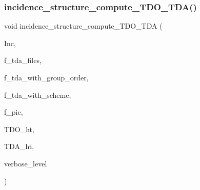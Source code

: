 \subsubsection{\texorpdfstring{incidence\+\_\+structure\+\_\+compute\+\_\+\+T\+D\+O\+\_\+\+T\+D\+A()}{incidence\_structure\_compute\_TDO\_TDA()}}
{\footnotesize\ttfamily void incidence\+\_\+structure\+\_\+compute\+\_\+\+T\+D\+O\+\_\+\+T\+DA (\begin{DoxyParamCaption}\item[{\mbox{\hyperlink{classincidence__structure}{incidence\+\_\+structure}} $\ast$}]{Inc,  }\item[{\mbox{\hyperlink{galois_8h_a09fddde158a3a20bd2dcadb609de11dc}{I\+NT}}}]{f\+\_\+tda\+\_\+files,  }\item[{\mbox{\hyperlink{galois_8h_a09fddde158a3a20bd2dcadb609de11dc}{I\+NT}}}]{f\+\_\+tda\+\_\+with\+\_\+group\+\_\+order,  }\item[{\mbox{\hyperlink{galois_8h_a09fddde158a3a20bd2dcadb609de11dc}{I\+NT}}}]{f\+\_\+tda\+\_\+with\+\_\+scheme,  }\item[{\mbox{\hyperlink{galois_8h_a09fddde158a3a20bd2dcadb609de11dc}{I\+NT}}}]{f\+\_\+pic,  }\item[{\mbox{\hyperlink{galois_8h_a09fddde158a3a20bd2dcadb609de11dc}{I\+NT}} \&}]{T\+D\+O\+\_\+ht,  }\item[{\mbox{\hyperlink{galois_8h_a09fddde158a3a20bd2dcadb609de11dc}{I\+NT}} \&}]{T\+D\+A\+\_\+ht,  }\item[{\mbox{\hyperlink{galois_8h_a09fddde158a3a20bd2dcadb609de11dc}{I\+NT}}}]{verbose\+\_\+level }\end{DoxyParamCaption})}

\mbox{\label{_t_o_p___l_e_v_e_l_2incidence__structure_8_c_a8e3d42d0018f8a804b9686b1c4951186}} 
